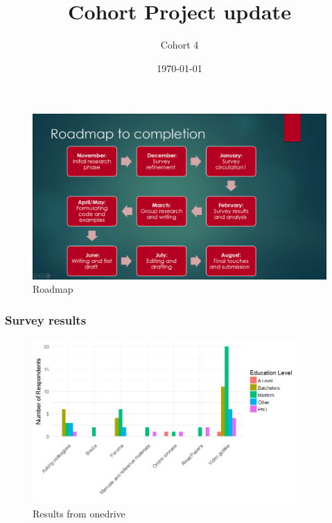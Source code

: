 \documentclass{beamer}
\title{Cohort Project update}
\author{Cohort 4}
\institute{Quantum Engineering CDT \\ University of Bristol}
\date{\today}
\begin{document}
\frame{\titlepage}

\begin{frame}
\frametitle{}
\begin{figure}[H]
\centering
\includegraphics[width=1.00\textwidth]{roadmap.png}
\caption{Roadmap\footnotemap}
\end{figure}
\end{frame}



\begin{frame}
\frametitle{Survey results}
\begin{figure}[H]
	\centering
	\includegraphics[width=0.9\textwidth]{Learn_Ed_Final.png}
	\caption{Results from onedrive \footnotemark}
	\label{}
\end{figure}
\end{frame}
\end{document}
